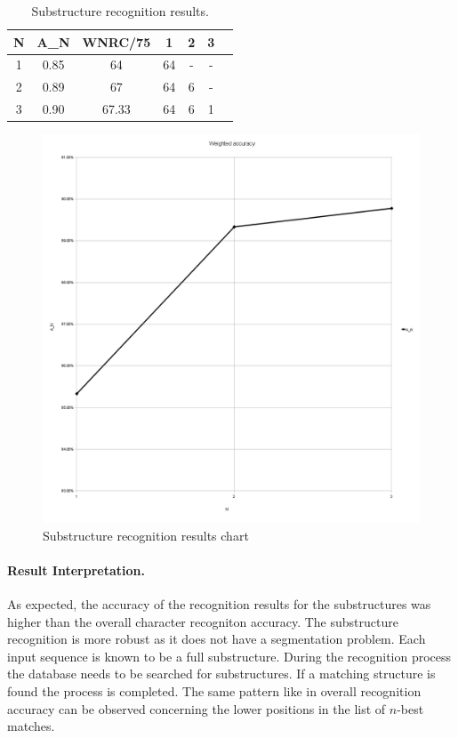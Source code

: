 \begin{table}[htbp]
\begin{center}
  \begin{tabular}{|c|c|c|c|c|c|p{200pt}|}
    \hline
N &  A_N & WNRC/75&  1 & 2 & 3 \\
    \hline
1 & 0.85 & 64     & 64 & - & - \\
    \hline
2 & 0.89 & 67     & 64 & 6 & - \\
    \hline
3 & 0.90 & 67.33  & 64 & 6 & 1 \\
    \hline
  \end{tabular}
\end{center}
\caption{Substructure recognition results.}
\label{table:eval:substructurerecognitionresults}
\end{table}

\begin{figure}[htbp]
  \begin{center}
    \includegraphics[scale=0.5]{images/weightedAccuracySubstructures.png}
    \caption{Substructure recognition results chart}
    \label{fig:eval:substructurerecognitionresults}
  \end{center}
\end{figure}

\paragraph{Result Interpretation.}
As expected, the accuracy of the recognition results for the substructures
was higher than the overall character recogniton accuracy.
The substructure recognition is more robust as it does not have a segmentation
problem. Each input sequence is known to be a full substructure. 
During the recognition process the database needs to be searched for 
substructures. If a matching structure is found the process is completed.
The same pattern like in overall recognition accuracy can be observed 
concerning the lower positions in the list of \(n\)-best matches.


